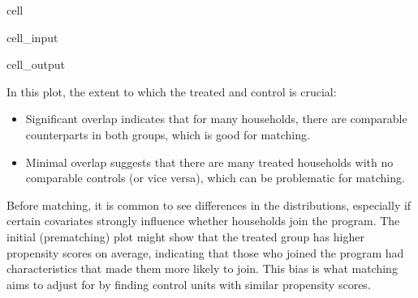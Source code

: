 \documentclass[letterpaper,10pt,english]{jupyterBook}
\begin{document}
\begin{sphinxuseclass}{cell}
\begin{sphinxVerbatimInput}
\begin{sphinxuseclass}{cell_input}
\end{sphinxuseclass}\end{sphinxVerbatimInput}
\begin{sphinxVerbatimOutput}

\begin{sphinxuseclass}{cell_output}
\noindent{}

\end{sphinxuseclass}\end{sphinxVerbatimOutput}

\end{sphinxuseclass}
\sphinxAtStartPar
In this plot, the extent to which the treated and control  is crucial:
\begin{itemize}
\item {} 
\sphinxAtStartPar
Significant overlap indicates that for many households, there are comparable counterparts in both groups, which is good for matching.

\item {} 
\sphinxAtStartPar
Minimal overlap suggests that there are many treated households with no comparable controls (or vice versa), which can be problematic for matching.

\end{itemize}

\sphinxAtStartPar
Before matching, it is common to see differences in the distributions, especially if certain covariates strongly influence whether households join the program. The initial (pre\sphinxhyphen{}matching) plot might show that the treated group has higher propensity scores on average, indicating that those who joined the program had characteristics that made them more likely to join. This bias is what matching aims to adjust for by finding control units with similar propensity scores.
\end{document}
